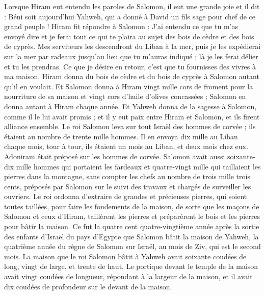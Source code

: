 \begin{multicols}{2}
Lorsque Hiram eut entendu les paroles de Salomon, il eut une grande joie et il dit : Béni soit aujourd'hui Yahweh, qui a donné à David un fils sage pour chef de ce grand peuple !
Hiram fit répondre à Salomon : J'ai entendu ce que tu m'as envoyé dire et je ferai tout ce qui te plaira au sujet des bois de cèdre et des bois de cyprès.
Mes serviteurs les descendront du Liban à la mer, puis je les expédierai sur la mer par radeaux jusqu'au lieu que tu m'auras indiqué ; là je les ferai délier et tu les prendras. Ce que je désire en retour, c'est que tu fournisses des vivres à ma maison.
Hiram donna du bois de cèdre et du bois de cyprès à Salomon autant qu'il en voulait.
Et Salomon donna à Hiram vingt mille cors de froment pour la nourriture de sa maison et vingt cors d'huile d'olives concassées ; Salomon en donna autant à Hiram chaque année.
Et Yahweh donna de la sagesse à Salomon, comme il le lui avait promis ; et il y eut paix entre Hiram et Salomon, et ils firent alliance ensemble.
Le roi Salomon leva sur tout Israël des hommes de corvée ; ils étaient au nombre de trente mille hommes.
Il en envoya dix mille au Liban chaque mois, tour à tour, ils étaient un mois au Liban, et deux mois chez eux. Adoniram était préposé sur les hommes de corvée.
Salomon avait aussi soixante-dix mille hommes qui portaient les fardeaux et quatre-vingt mille qui taillaient les pierres dans la montagne,
sans compter les chefs au nombre de trois mille trois cents, préposés par Salomon sur le suivi des travaux et chargés de surveiller les ouvriers.
Le roi ordonna d'extraire de grandes et précieuses pierres, qui soient toutes taillées, pour faire les fondements de la maison,
de sorte que les maçons de Salomon et ceux d'Hiram, taillèrent les pierres et préparèrent le bois et les pierres pour bâtir la maison.
\VerseOne{}Ce fut la quatre cent quatre-vingtième année après la sortie des enfants d'Israël du pays d'Egypte que Salomon bâtit la maison de Yahweh, la quatrième année du règne de Salomon sur Israël, au mois de Ziv, qui est le second mois.
La maison que le roi Salomon bâtit à Yahweh avait soixante coudées de long, vingt de large, et trente de haut.
Le portique devant le temple de la maison avait vingt coudées de longueur, répondant à la largeur de la maison, et il avait dix coudées de profondeur sur le devant de la maison.

\end{multicols}
